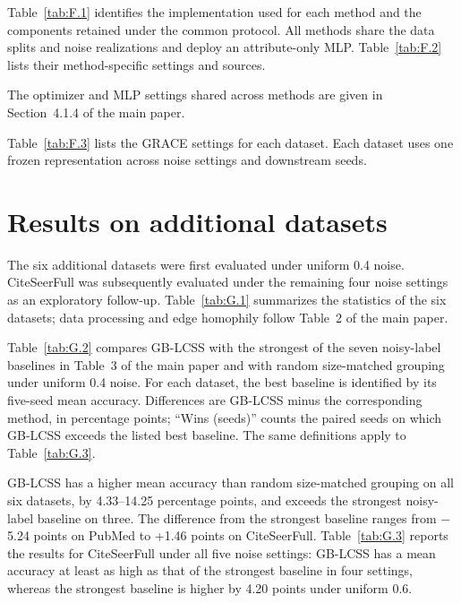 \documentclass[times,10pt]{elsarticle}
\begin{document}
Table~\ref{tab:F.1} identifies the implementation used for each method and the components retained under the common protocol. All methods share the data splits and noise realizations and deploy an attribute-only MLP. Table~\ref{tab:F.2} lists their method-specific settings and sources.



The optimizer and MLP settings shared across methods are given in Section~4.1.4 of the main paper.



Table~\ref{tab:F.3} lists the GRACE settings for each dataset. Each dataset uses one frozen representation across noise settings and downstream seeds.


\setcounter{table}{0}

\section{Results on additional datasets}\label{sec:G}

The six additional datasets were first evaluated under uniform 0.4 noise. CiteSeerFull was subsequently evaluated under the remaining four noise settings as an exploratory follow-up. Table~\ref{tab:G.1} summarizes the statistics of the six datasets; data processing and edge homophily follow Table~2 of the main paper.



Table~\ref{tab:G.2} compares GB-LCSS with the strongest of the seven noisy-label baselines in Table~3 of the main paper and with random size-matched grouping under uniform 0.4 noise. For each dataset, the best baseline is identified by its five-seed mean accuracy. Differences are GB-LCSS minus the corresponding method, in percentage points; ``Wins (seeds)'' counts the paired seeds on which GB-LCSS exceeds the listed best baseline. The same definitions apply to Table~\ref{tab:G.3}.



GB-LCSS has a higher mean accuracy than random size-matched grouping on all six datasets, by 4.33--14.25 percentage points, and exceeds the strongest noisy-label baseline on three. The difference from the strongest baseline ranges from \ensuremath{-}5.24 points on PubMed to +1.46 points on CiteSeerFull. Table~\ref{tab:G.3} reports the results for CiteSeerFull under all five noise settings: GB-LCSS has a mean accuracy at least as high as that of the strongest baseline in four settings, whereas the strongest baseline is higher by 4.20 points under uniform 0.6.
\end{document}
